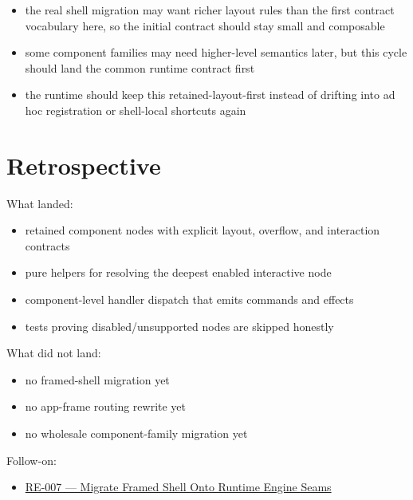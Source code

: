\begin{itemize}
\tightlist
\item
  the real shell migration may want richer layout rules than the first contract vocabulary here, so the initial contract should stay small and composable
\item
  some component families may need higher-level semantics later, but this cycle should land the common runtime contract first
\item
  the runtime should keep this retained-layout-first instead of drifting into ad hoc registration or shell-local shortcuts again
\end{itemize}

\section{Retrospective}\label{record-154-retrospective}

What landed:

\begin{itemize}
\tightlist
\item
  retained component nodes with explicit layout, overflow, and interaction contracts
\item
  pure helpers for resolving the deepest enabled interactive node
\item
  component-level handler dispatch that emits commands and effects
\item
  tests proving disabled/unsupported nodes are skipped honestly
\end{itemize}

What did not land:

\begin{itemize}
\tightlist
\item
  no framed-shell migration yet
\item
  no app-frame routing rewrite yet
\item
  no wholesale component-family migration yet
\end{itemize}

Follow-on:

\begin{itemize}
\tightlist
\item
  \href{https://github.com/flyingrobots/bijou/blob/cbd70612140e7a450d764b3c7be1c6af878b99bc/docs/method/graveyard/legacy-backlog/up-next/RE-007-migrate-framed-shell-onto-runtime-engine-seams.md}{RE-007 --- Migrate Framed Shell Onto Runtime Engine Seams}
\end{itemize}

